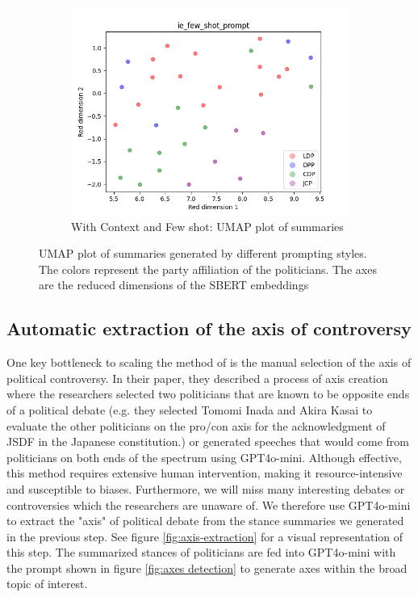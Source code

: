 \documentclass[final,5p,times,twocolumn,authoryear]{elsarticle}
\begin{document}
\begin{figure}[h]
\begin{subfigure}{0.22\textwidth}
  \includegraphics[width=1\linewidth]{figs/ie_few_shot_prompt_umap.png}
  \caption{With Context and Few shot: UMAP plot of summaries}
\end{subfigure}
\caption{UMAP plot of summaries generated by different prompting styles. The colors represent the party affiliation of the politicians. The axes are the reduced dimensions of the SBERT embeddings}
\label{fig:UMAP prompt comparison}
\end{figure}

\subsection{Automatic extraction of the axis of controversy}
\label{section: extraction of axis of controversy}

One key bottleneck to scaling the method of \citeauthor{kato2024lupinllmbasedpoliticalideology} is the manual selection of the axis of political controversy. In their paper, they described a process of axis creation where the researchers selected two politicians that are known to be opposite ends of a political debate (e.g. they selected Tomomi Inada and Akira Kasai to evaluate the other politicians on the pro/con axis for the acknowledgment of JSDF in the Japanese constitution.) or generated speeches that would come from politicians on both ends of the spectrum using GPT4o-mini. Although effective, this method requires extensive human intervention, making it resource-intensive and susceptible to biases. Furthermore, we will miss many interesting debates or controversies which the researchers are unaware of. We therefore use GPT4o-mini to extract the "axis" of political debate from the stance summaries we generated in the previous step. See figure \ref{fig:axis-extraction} for a visual representation of this step. The summarized stances of politicians are fed into GPT4o-mini with the prompt shown in figure \ref{fig:axes detection} to generate axes within the broad topic of interest. 
\end{document}

